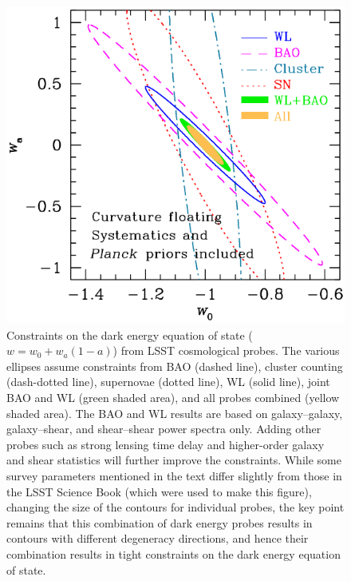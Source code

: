 \begin{figure}
\includegraphics[width=1.0\hsize,clip]{cswb.pdf}
\caption{
Constraints on the dark energy equation of state ($w = w_0 +
w_a(1-a)$) from LSST cosmological probes.  The various ellipses assume
constraints from BAO (dashed line), cluster counting (dash-dotted line),
supernovae (dotted line), WL (solid line), joint BAO and WL
(green shaded area), and all probes combined (yellow shaded area).
The BAO and WL results are based on galaxy--galaxy, galaxy--shear,
and shear--shear power spectra only.
Adding other probes such as strong lensing time delay
and higher-order galaxy and shear statistics will further improve
the constraints.  While some survey parameters mentioned in the text differ slightly from
those in the LSST Science Book (which were used to make this figure), changing the size of the
contours for individual probes, the key point remains that
this combination of dark energy probes results in contours with different degeneracy directions, and
hence their combination results in tight constraints on the dark energy equation of state. }
\label{Fig:DEellipses}
\end{figure}





